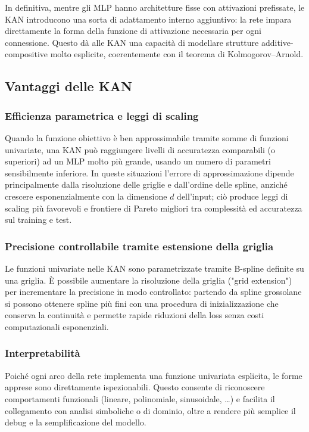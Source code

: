 \documentclass[a4paper,12pt]{report}
\begin{document}
	In definitiva, mentre gli MLP hanno architetture fisse con attivazioni prefissate, le KAN introducono una sorta di adattamento interno aggiuntivo: la rete impara direttamente la forma della funzione di attivazione necessaria per ogni connessione. Questo dà alle KAN una capacità di modellare strutture additive-compositive molto esplicite, coerentemente con il teorema di Kolmogorov–Arnold.
	
	\subsection{Vantaggi delle KAN}
	
	\subsubsection{Efficienza parametrica e leggi di scaling} 
	Quando la funzione obiettivo è ben approssimabile tramite somme di funzioni univariate, una KAN può raggiungere livelli di accuratezza comparabili (o superiori) ad un MLP molto più grande, usando un numero di parametri sensibilmente inferiore. In queste situazioni l'errore di approssimazione dipende principalmente dalla risoluzione delle griglie e dall'ordine delle spline, anziché crescere esponenzialmente con la dimensione \(d\) dell'input; ciò produce leggi di scaling più favorevoli e frontiere di Pareto migliori tra complessità ed accuratezza sul training e test.
	
	\subsubsection{Precisione controllabile tramite estensione della griglia}
	Le funzioni univariate nelle KAN sono parametrizzate tramite B-spline definite su una griglia. È possibile aumentare la risoluzione della griglia ("grid extension") per incrementare la precisione in modo controllato: partendo da spline grossolane si possono ottenere spline più fini con una procedura di inizializzazione che conserva la continuità e permette rapide riduzioni della loss senza costi computazionali esponenziali.
	
	\subsubsection{Interpretabilità}
	Poiché ogni arco della rete implementa una funzione univariata esplicita, le forme apprese sono direttamente ispezionabili. Questo consente di riconoscere comportamenti funzionali (lineare, polinomiale, sinusoidale, \ldots) e facilita il collegamento con analisi simboliche o di dominio, oltre a rendere più semplice il debug e la semplificazione del modello.
	
\end{document}
